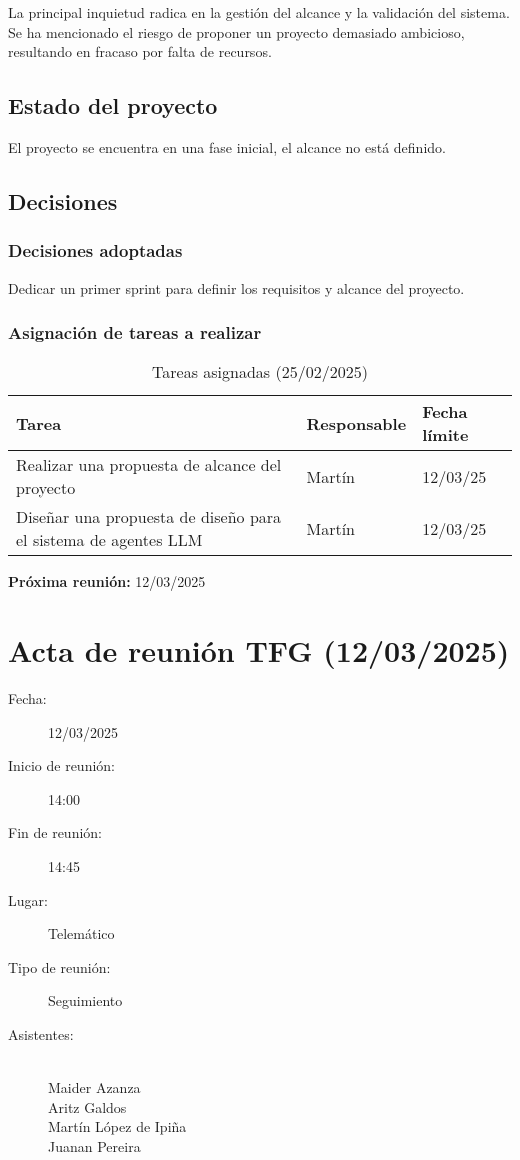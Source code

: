 La principal inquietud radica en la gestión del alcance y la validación del sistema. Se ha mencionado el riesgo de proponer un proyecto demasiado ambicioso, resultando en fracaso por falta de recursos.

\subsection{Estado del proyecto}
El proyecto se encuentra en una fase inicial, el alcance no está definido.

\subsection{Decisiones}
\subsubsection{Decisiones adoptadas}
Dedicar un primer sprint para definir los requisitos y alcance del proyecto. 

\subsubsection{Asignación de tareas a realizar}
\begin{table}[h]
    \centering
    \begin{tabular}{|p{8cm}|p{3cm}|p{3cm}|}
        \hline
        \textbf{Tarea} & \textbf{Responsable} & \textbf{Fecha límite} \\
        \hline
        Realizar una propuesta de alcance del proyecto & Martín & 12/03/25 \\
        \hline
        Diseñar una propuesta de diseño para el sistema de agentes LLM & Martín & 12/03/25 \\
        \hline
    \end{tabular}
    \caption{Tareas asignadas (25/02/2025)}
\end{table}

\textbf{Próxima reunión:} 12/03/2025

\clearpage

\section{Acta de reunión TFG (12/03/2025)}

\begin{description}
    \item[Fecha:] 12/03/2025
    \item[Inicio de reunión:] 14:00
    \item[Fin de reunión:] 14:45
    \item[Lugar:] Telemático
    \item[Tipo de reunión:] Seguimiento
    \item[Asistentes:] ~\\
    Maider Azanza\\
    Aritz Galdos\\
    Martín López de Ipiña\\
    Juanan Pereira
\end{description}

